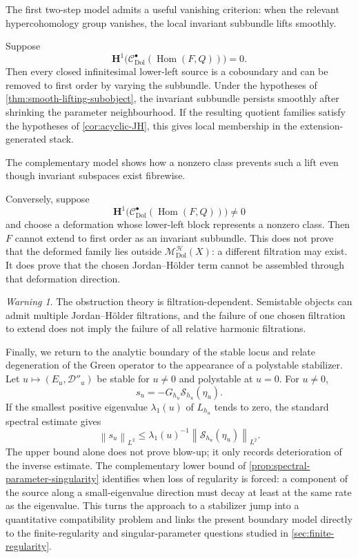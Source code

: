 \documentclass[11pt,reqno]{amsart}
\theoremstyle{definition}
\theoremstyle{remark}
\newtheorem{warning}[theorem]{Warning}
\newcommand{\cC}{\mathcal C}
\newcommand{\cD}{\mathcal D}
\newcommand{\cH}{\mathcal H}
\newcommand{\cS}{\mathcal S}
\newcommand{\Hom}{\operatorname{Hom}}
\newcommand{\Dol}{\mathrm{Dol}}
\newcommand{\norm}[1]{\left\lVert #1\right\rVert}
\newcommand{\MHDol}{\mathscr M^{\cH}_{\Dol}}
\begin{document}
The first two-step model admits a useful vanishing criterion: when the relevant hypercohomology group vanishes, the local invariant subbundle lifts smoothly.


Suppose
\[
  \mathbf H^1\bigl(\cC^\bullet_{\Dol}(\Hom(F,Q))\bigr)=0.
\]
Then every closed infinitesimal lower-left source is a coboundary and can be removed to first order by varying the subbundle.  Under the hypotheses of \cref{thm:smooth-lifting-subobject}, the invariant subbundle persists smoothly after shrinking the parameter neighbourhood.  If the resulting quotient families satisfy the hypotheses of \cref{cor:acyclic-JH}, this gives local membership in the extension-generated stack.


The complementary model shows how a nonzero class prevents such a lift even though invariant subspaces exist fibrewise.


Conversely, suppose
\[
  \mathbf H^1\bigl(\cC^\bullet_{\Dol}(\Hom(F,Q))\bigr)\ne0
\]
and choose a deformation whose lower-left block represents a nonzero class.  Then $F$ cannot extend to first order as an invariant subbundle.  This does not prove that the deformed family lies outside $\MHDol(X)$: a different filtration may exist.  It does prove that the chosen Jordan--H\"older term cannot be assembled through that deformation direction.

\begin{warning}
The obstruction theory is filtration-dependent.  Semistable objects can admit multiple Jordan--H\"older filtrations, and the failure of one chosen filtration to extend does not imply the failure of all relative harmonic filtrations.
\end{warning}


Finally, we return to the analytic boundary of the stable locus and relate degeneration of the Green operator to the appearance of a polystable stabilizer.  Let $u\mapsto(E_u,\cD''_u)$ be stable for $u\ne0$ and polystable at $u=0$.  For $u\ne0$,
\[
  s_u=-G_{h_u}\cS_{h_u}(\eta_u).
\]
If the smallest positive eigenvalue $\lambda_1(u)$ of $L_{h_u}$ tends to zero, the standard spectral estimate gives
\begin{equation}\label{eq:blowup-estimate}
  \norm{s_u}_{L^2}
  \le \lambda_1(u)^{-1}\norm{\cS_{h_u}(\eta_u)}_{L^2}.
\end{equation}
The upper bound alone does not prove blow-up; it only records deterioration of the inverse estimate.  The complementary lower bound of \cref{prop:spectral-parameter-singularity} identifies when loss of regularity is forced: a component of the source along a small-eigenvalue direction must decay at least at the same rate as the eigenvalue.  This turns the approach to a stabilizer jump into a quantitative compatibility problem and links the present boundary model directly to the finite-regularity and singular-parameter questions studied in \cref{sec:finite-regularity}.
\end{document}
